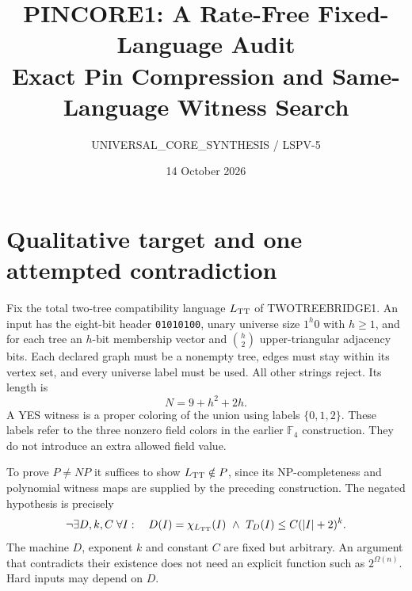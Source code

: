 \documentclass[11pt]{article}
\title{PINCORE1: A Rate-Free Fixed-Language Audit\\
\large Exact Pin Compression and Same-Language Witness Search}
\author{UNIVERSAL\_CORE\_SYNTHESIS / LSPV-5}
\date{14 October 2026}
\newcommand{\Col}{\{0,1,2\}}
\begin{document}
\maketitle
\begin{center}
\end{center}

\section{Qualitative target and one attempted contradiction}
Fix the total two-tree compatibility language $L_{\rm TT}$ of TWOTREEBRIDGE1.
An input has the eight-bit header \texttt{01010100}, unary universe size
$1^h0$ with $h\ge1$, and for each tree an $h$-bit membership vector and
$\binom h2$ upper-triangular adjacency bits. Each declared graph must be a
nonempty tree, edges must stay within its vertex set, and every universe
label must be used. All other strings reject. Its length is
\[
                  N=9+h^2+2h.
\]
A YES witness is a proper coloring of the union using labels $\Col$. These
labels refer to the three nonzero field colors in the earlier $\mathbb F_4$
construction. They do not introduce an extra allowed field value.

To prove $P\ne NP$ it suffices to show $L_{\rm TT}\notin P$, since its
NP-completeness and polynomial witness maps are supplied by the preceding
construction. The negated hypothesis is precisely
\[
 \neg\exists D,k,C\;\forall I:\quad
 D(I)=\chi_{L_{\rm TT}}(I)\ \land\
 T_D(I)\le C(|I|+2)^k.
\]
The machine $D$, exponent $k$ and constant $C$ are fixed but arbitrary.
An argument that contradicts their existence does not need an explicit
function such as $2^{\Omega(n)}$. Hard inputs may depend on $D$.
\end{document}
